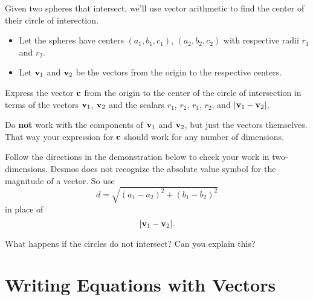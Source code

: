 \documentclass{ximera}
\begin{document}
\begin{question}  \label{Q45367:Vectors}
Given two spheres that intersect, we'll use vector arithmetic to find the center of their circle of interection.

\begin{itemize}

\item{Let the spheres have centers $(a_1, b_1, c_1)$, $(a_2, b_2, c_2)$ with respective radii $r_1$ and $r_2$.} 

\item{Let ${\bf v}_1$ and ${\bf v}_2$ be the vectors from the origin to the respective centers.}

\end{itemize}

Express the vector ${\bf c}$ from the origin to the center of the circle of intersection in terms of the vectors ${\bf v}_1$, ${\bf v}_2$ and the scalars $r_1$, $r_2$, $r_1$, $r_2$, and $|{\bf v}_1-{\bf v}_2|$. 

Do {\bf not} work with the components of ${\bf v}_1$ and ${\bf v}_2$, but just the vectors themselves. That way your expression for ${\bf c}$ should work for any number of dimensions. 

Follow the directions in the demonstration below to check your work in two-dimensions. Desmos does not recognize the absolute value symbol for the magnitude of a vector. So use 
\[
    d = \sqrt{(a_1-a_2)^2 + (b_1-b_2)^2}
\]
in place of 
\[
   |{\bf v}_1-{\bf v}_2|.
\]

What happens if the circles do not intersect? Can you explain this?



 
\begin{onlineOnly}
    \begin{center}
\end{center}
\end{onlineOnly}


\end{question}



\section{Writing Equations with Vectors}
\end{document}
